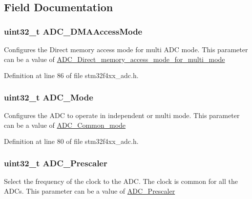 \subsection{Field Documentation}
\hypertarget{struct_a_d_c___common_init_type_def_a7a07e47276e023bd25354c0841090072}{
\subsubsection[{A\-D\-C\-\_\-\-D\-M\-A\-Access\-Mode}]{\setlength{\rightskip}{0pt plus 5cm}uint32\-\_\-t A\-D\-C\-\_\-\-D\-M\-A\-Access\-Mode}}\label{struct_a_d_c___common_init_type_def_a7a07e47276e023bd25354c0841090072}
Configures the Direct memory access mode for multi A\-D\-C mode. This parameter can be a value of \hyperlink{group___a_d_c___direct__memory__access__mode__for__multi__mode}{A\-D\-C\-\_\-\-Direct\-\_\-memory\-\_\-access\-\_\-mode\-\_\-for\-\_\-multi\-\_\-mode} 

Definition at line 86 of file stm32f4xx\-\_\-adc.\-h.

\hypertarget{struct_a_d_c___common_init_type_def_a7876bb5e90dfb86b6d3125f00dbc1c62}{
\subsubsection[{A\-D\-C\-\_\-\-Mode}]{\setlength{\rightskip}{0pt plus 5cm}uint32\-\_\-t A\-D\-C\-\_\-\-Mode}}\label{struct_a_d_c___common_init_type_def_a7876bb5e90dfb86b6d3125f00dbc1c62}
Configures the A\-D\-C to operate in independent or multi mode. This parameter can be a value of \hyperlink{group___a_d_c___common__mode}{A\-D\-C\-\_\-\-Common\-\_\-mode} 

Definition at line 80 of file stm32f4xx\-\_\-adc.\-h.

\hypertarget{struct_a_d_c___common_init_type_def_af8239af49e67326025d674ff29eaf4a1}{
\subsubsection[{A\-D\-C\-\_\-\-Prescaler}]{\setlength{\rightskip}{0pt plus 5cm}uint32\-\_\-t A\-D\-C\-\_\-\-Prescaler}}\label{struct_a_d_c___common_init_type_def_af8239af49e67326025d674ff29eaf4a1}
Select the frequency of the clock to the A\-D\-C. The clock is common for all the A\-D\-Cs. This parameter can be a value of \hyperlink{group___a_d_c___prescaler}{A\-D\-C\-\_\-\-Prescaler} 

